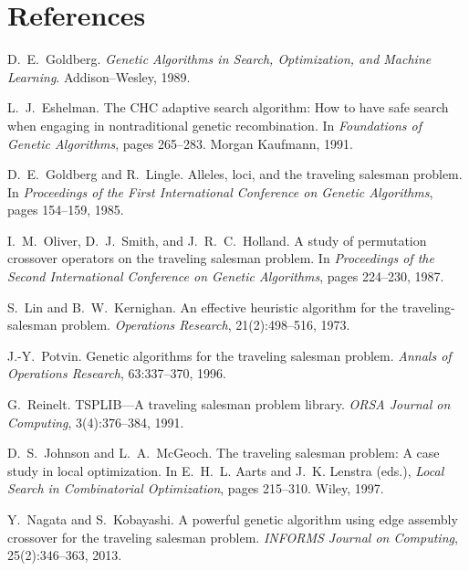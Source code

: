 \documentclass{article}
\begin{document}
\section{References}
\begin{thebibliography}{99}

D.~E.~Goldberg.
\newblock \emph{Genetic Algorithms in Search, Optimization, and Machine Learning}.
\newblock Addison--Wesley, 1989.

L.~J.~Eshelman.
\newblock The CHC adaptive search algorithm: How to have safe search when engaging in nontraditional genetic recombination.
\newblock In \emph{Foundations of Genetic Algorithms}, pages 265--283. Morgan Kaufmann, 1991.

D.~E.~Goldberg and R.~Lingle.
\newblock Alleles, loci, and the traveling salesman problem.
\newblock In \emph{Proceedings of the First International Conference on Genetic Algorithms}, pages 154--159, 1985.

I.~M.~Oliver, D.~J.~Smith, and J.~R.~C.~Holland.
\newblock A study of permutation crossover operators on the traveling salesman problem.
\newblock In \emph{Proceedings of the Second International Conference on Genetic Algorithms}, pages 224--230, 1987.

S.~Lin and B.~W.~Kernighan.
\newblock An effective heuristic algorithm for the traveling-salesman problem.
\newblock \emph{Operations Research}, 21(2):498--516, 1973.

J.-Y.~Potvin.
\newblock Genetic algorithms for the traveling salesman problem.
\newblock \emph{Annals of Operations Research}, 63:337--370, 1996.

G.~Reinelt.
\newblock TSPLIB---A traveling salesman problem library.
\newblock \emph{ORSA Journal on Computing}, 3(4):376--384, 1991.

D.~S.~Johnson and L.~A.~McGeoch.
\newblock The traveling salesman problem: A case study in local optimization.
\newblock In E.~H.~L. Aarts and J.~K. Lenstra (eds.), \emph{Local Search in Combinatorial Optimization}, pages 215--310. Wiley, 1997.

Y.~Nagata and S.~Kobayashi.
\newblock A powerful genetic algorithm using edge assembly crossover for the traveling salesman problem.
\newblock \emph{INFORMS Journal on Computing}, 25(2):346--363, 2013.


\end{thebibliography}
\end{document}

